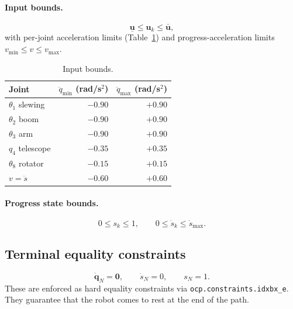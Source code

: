 \documentclass[11pt, a4paper]{article}
\newcommand{\dqd}{\dot{\bm{q}}}   %
\begin{document}
\paragraph{Input bounds.}
\begin{equation}
  \underline{\bm{u}} \leq \bm{u}_k \leq \bar{\bm{u}},
\end{equation}
with per-joint acceleration limits (Table~\ref{tab:ulimits}) and progress-acceleration
limits $v_\min \leq v \leq v_\max$.

\begin{table}[h]
  \centering
  \begin{tabular}{lrr}
    \toprule
    Joint & $\ddot{q}_\min$ (rad/s$^2$) & $\ddot{q}_\max$ (rad/s$^2$) \\
    \midrule
    $\theta_1$ slewing    & $-0.90$ & $+0.90$ \\
    $\theta_2$ boom       & $-0.90$ & $+0.90$ \\
    $\theta_3$ arm        & $-0.90$ & $+0.90$ \\
    $q_4$ telescope       & $-0.35$ & $+0.35$ \\
    $\theta_8$ rotator    & $-0.15$ & $+0.15$ \\
    $v = \ddot{s}$        & $-0.60$ & $+0.60$ \\
    \bottomrule
  \end{tabular}
  \caption{Input bounds.}
  \label{tab:ulimits}
\end{table}

\paragraph{Progress state bounds.}
\begin{equation}
  0 \leq s_k \leq 1, \qquad 0 \leq \dot{s}_k \leq \dot{s}_\max.
\end{equation}

\subsection{Terminal equality constraints}

\begin{equation}
  \dqd_N = \bm{0}, \qquad \dot{s}_N = 0, \qquad s_N = 1.
\end{equation}
These are enforced as hard equality constraints via \texttt{ocp.constraints.idxbx\_e}.
They guarantee that the robot comes to rest at the end of the path.

\end{document}
